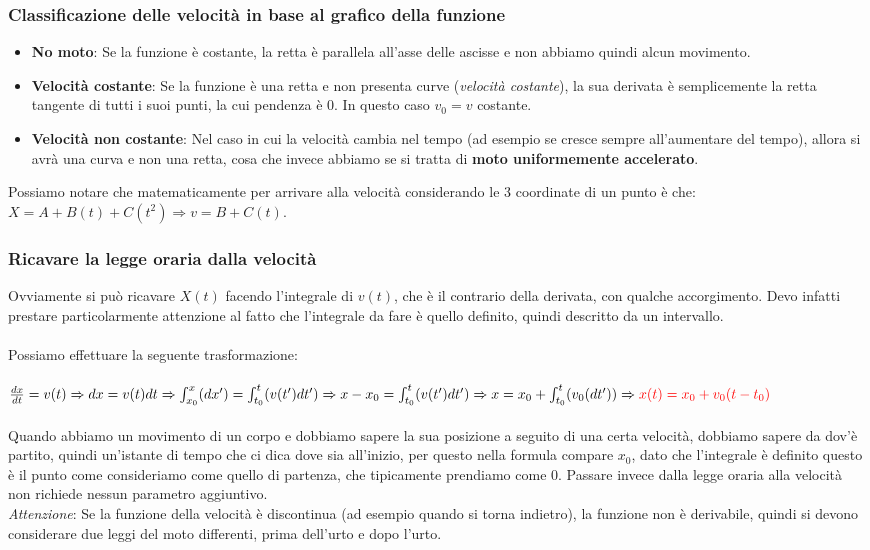 \documentclass[a4paper,12pt]{report}
\begin{document}
	\subsubsection{Classificazione delle velocità in base al grafico della funzione}
	\begin{itemize}
		\item \textbf{No moto}: Se la funzione è costante, la retta è parallela all'asse delle ascisse e non abbiamo quindi alcun movimento.
		\item \textbf{Velocità costante}: Se la funzione è una retta e non presenta curve (\textit{velocità costante}), la sua derivata è semplicemente la retta tangente di tutti i suoi punti, la cui pendenza è 0. In questo caso ${v_0 = v}$ costante.
		\item \textbf{Velocità non costante}: Nel caso in cui la velocità cambia nel tempo (ad esempio se cresce sempre all'aumentare del tempo), allora si avrà una curva e non una retta, cosa che invece abbiamo se si tratta di \textbf{moto uniformemente accelerato}.
	\end{itemize}
	Possiamo notare che matematicamente per arrivare alla velocità considerando le 3 coordinate di un punto è che: ${{X = A + B(t) + C(t^2)} \Rightarrow {v = B + C(t)}}$.
	\subsubsection{Ricavare la legge oraria dalla velocità}
	Ovviamente si può ricavare $X(t)$ facendo l'integrale di $v(t)$, che è il contrario della derivata, con qualche accorgimento. Devo infatti prestare particolarmente attenzione al fatto che l'integrale da fare è quello definito, quindi descritto da un intervallo.\\\\
	Possiamo effettuare la seguente trasformazione:\\\\
	${\frac{dx}{dt} = v(t)}\Rightarrow\\{{dx} = {v(t)dt}} \Rightarrow\\{\int_{x_0}^{x}(dx')} = {\int_{t_0}^{t}(v(t')dt')} \Rightarrow\\{x-x_0} = {\int_{t_0}^{t}(v(t')dt')}\Rightarrow\\{x} = {x_0} + {\int_{t_0}^{t}(v_0(dt'))} \Rightarrow \mathcolor{red}{{x(t) = x_0 + v_0(t-t_0)}}$\\\\
	Quando abbiamo un movimento di un corpo e dobbiamo sapere la sua posizione a seguito di una certa velocità, dobbiamo sapere da dov'è partito, quindi un'istante di tempo che ci dica dove sia all'inizio, per questo nella formula compare $x_0$, dato che l'integrale è definito questo è il punto come consideriamo come quello di partenza, che tipicamente prendiamo come $0$. Passare invece dalla legge oraria alla velocità non richiede nessun parametro aggiuntivo.\\ \textit{Attenzione}: Se la funzione della velocità è discontinua (ad esempio quando si torna indietro), la funzione non è derivabile, quindi si devono considerare due leggi del moto differenti, prima dell'urto e dopo l'urto.
\end{document}
